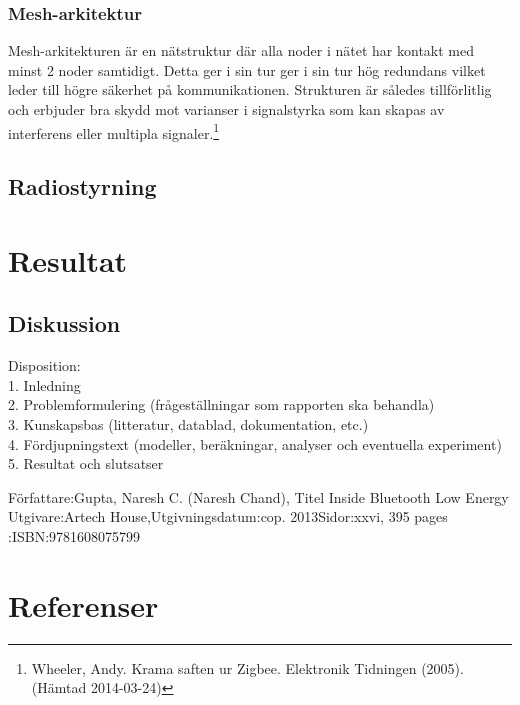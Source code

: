 \documentclass[a4paper,12pt,fleqn]{article}
\begin{document}
\subsubsection{Mesh-arkitektur}
Mesh-arkitekturen är en nätstruktur där alla noder i nätet har kontakt med minst 2 noder samtidigt. Detta ger i sin tur ger i sin tur hög redundans vilket leder till högre säkerhet på kommunikationen. Strukturen är således tillförlitlig och erbjuder bra skydd mot varianser i signalstyrka som kan skapas av interferens eller multipla signaler.\footnote{Wheeler, Andy. Krama saften ur Zigbee. Elektronik Tidningen (2005).(Hämtad 2014-03-24)}


\subsection{Radiostyrning}
\section{Resultat}
\subsection{Diskussion}

Disposition: 
\\
1. Inledning 
\\
2. Problemformulering (frågeställningar som rapporten ska behandla) 
\\
3. Kunskapsbas (litteratur, datablad, dokumentation, etc.) 
\\
4. Fördjupningstext (modeller, beräkningar, analyser och eventuella experiment) 
\\
5. Resultat och slutsatser 






\newpage
\appendix
Författare:Gupta, Naresh C. (Naresh Chand), Titel Inside Bluetooth Low Energy Utgivare:Artech House,Utgivningsdatum:cop. 2013Sidor:xxvi, 395 pages :ISBN:9781608075799
\pagestyle{empty}
\section{Referenser}
\end{document}
